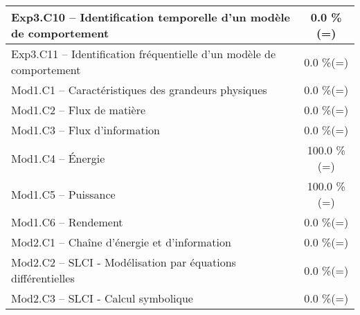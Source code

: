 \begin{center}
\begin{tabular}{|p{.7\linewidth}|c|}
Exp3.C10 -- Identification temporelle d’un modèle de comportement&0.0 \%(=)\\ \hline 
Exp3.C11 -- Identification fréquentielle d’un modèle de comportement&0.0 \%(=)\\ \hline 
Mod1.C1 -- Caractéristiques des grandeurs physiques&0.0 \%(=)\\ \hline 
Mod1.C2 -- Flux de matière&0.0 \%(=)\\ \hline 
Mod1.C3 -- Flux d’information&0.0 \%(=)\\ \hline 
Mod1.C4 -- Énergie&100.0 \%(=)\\ \hline 
Mod1.C5 -- Puissance&100.0 \%(=)\\ \hline 
Mod1.C6 -- Rendement&0.0 \%(=)\\ \hline 
Mod2.C1 -- Chaîne d’énergie et d'information&0.0 \%(=)\\ \hline 
Mod2.C2 -- SLCI - Modélisation par équations différentielles&0.0 \%(=)\\ \hline 
Mod2.C3 -- SLCI - Calcul symbolique&0.0 \%(=)\\ \hline 
\end{tabular} 
\end{center} 
\normalsize 
 
